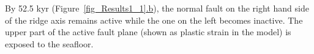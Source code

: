 
By 52.5 kyr (Figure~\hyperref[fig_Results1_1]{\ref{fig_Results1_1}.b}), the normal fault on the right hand side of the ridge axis remains active while the one on the left becomes inactive. 
The upper part of the active fault plane (shown as plastic strain in the model) is exposed to the seafloor.


